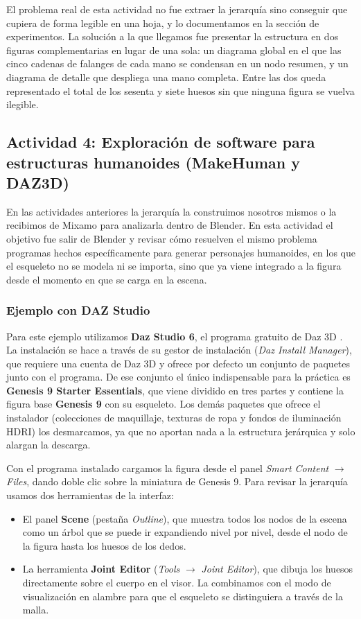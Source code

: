 El problema real de esta actividad no fue extraer la jerarquía sino conseguir que cupiera de forma legible en una hoja, y lo documentamos en la sección de experimentos. La solución a la que llegamos fue presentar la estructura en dos figuras complementarias en lugar de una sola: un diagrama global en el que las cinco cadenas de falanges de cada mano se condensan en un nodo resumen, y un diagrama de detalle que despliega una mano completa. Entre las dos queda representado el total de los sesenta y siete huesos sin que ninguna figura se vuelva ilegible.

\subsection{Actividad 4: Exploración de software para estructuras humanoides (MakeHuman y DAZ3D)}
En las actividades anteriores la jerarquía la construimos nosotros mismos o la recibimos de Mixamo para analizarla dentro de Blender. En esta actividad el objetivo fue salir de Blender y revisar cómo resuelven el mismo problema programas hechos específicamente para generar personajes humanoides, en los que el esqueleto no se modela ni se importa, sino que ya viene integrado a la figura desde el momento en que se carga en la escena.

\subsubsection{Ejemplo con DAZ Studio}

Para este ejemplo utilizamos \textbf{Daz Studio 6}, el programa gratuito de Daz 3D \cite{daz3d}. La instalación se hace a través de su gestor de instalación (\textit{Daz Install Manager}), que requiere una cuenta de Daz 3D y ofrece por defecto un conjunto de paquetes junto con el programa. De ese conjunto el único indispensable para la práctica es \textbf{Genesis 9 Starter Essentials}, que viene dividido en tres partes y contiene la figura base \textbf{Genesis 9} con su esqueleto. Los demás paquetes que ofrece el instalador (colecciones de maquillaje, texturas de ropa y fondos de iluminación HDRI) los desmarcamos, ya que no aportan nada a la estructura jerárquica y solo alargan la descarga.

Con el programa instalado cargamos la figura desde el panel \textit{Smart Content} $\to$ \textit{Files}, dando doble clic sobre la miniatura de Genesis 9. Para revisar la jerarquía usamos dos herramientas de la interfaz:
\begin{itemize}[noitemsep, topsep=4pt]
    \item El panel \textbf{Scene} (pestaña \textit{Outline}), que muestra todos los nodos de la escena como un árbol que se puede ir expandiendo nivel por nivel, desde el nodo de la figura hasta los huesos de los dedos.
    \item La herramienta \textbf{Joint Editor} (\textit{Tools} $\to$ \textit{Joint Editor}), que dibuja los huesos directamente sobre el cuerpo en el visor. La combinamos con el modo de visualización en alambre para que el esqueleto se distinguiera a través de la malla.
\end{itemize}


